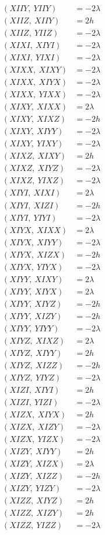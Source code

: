 \documentclass{article}
\begin{document}
\begin{align*}
  (XIIY,\ YIIY) &= - 2 \lambda \\
  (XIIZ,\ XIIY) &= 2 h \\
  (XIIZ,\ YIIZ) &= - 2 \lambda \\
  (XIXI,\ XIYI) &= - 2 \lambda \\
  (XIXI,\ YIXI) &= - 2 \lambda \\
  (XIXX,\ XIXY) &= - 2 \lambda \\
  (XIXX,\ XIYX) &= - 2 \lambda \\
  (XIXX,\ YIXX) &= - 2 \lambda \\
  (XIXY,\ XIXX) &= 2 \lambda \\
  (XIXY,\ XIXZ) &= - 2 h \\
  (XIXY,\ XIYY) &= - 2 \lambda \\
  (XIXY,\ YIXY) &= - 2 \lambda \\
  (XIXZ,\ XIXY) &= 2 h \\
  (XIXZ,\ XIYZ) &= - 2 \lambda \\
  (XIXZ,\ YIXZ) &= - 2 \lambda \\
  (XIYI,\ XIXI) &= 2 \lambda \\
  (XIYI,\ XIZI) &= - 2 h \\
  (XIYI,\ YIYI) &= - 2 \lambda \\
  (XIYX,\ XIXX) &= 2 \lambda \\
  (XIYX,\ XIYY) &= - 2 \lambda \\
  (XIYX,\ XIZX) &= - 2 h \\
  (XIYX,\ YIYX) &= - 2 \lambda \\
  (XIYY,\ XIXY) &= 2 \lambda \\
  (XIYY,\ XIYX) &= 2 \lambda \\
  (XIYY,\ XIYZ) &= - 2 h \\
  (XIYY,\ XIZY) &= - 2 h \\
  (XIYY,\ YIYY) &= - 2 \lambda \\
  (XIYZ,\ XIXZ) &= 2 \lambda \\
  (XIYZ,\ XIYY) &= 2 h \\
  (XIYZ,\ XIZZ) &= - 2 h \\
  (XIYZ,\ YIYZ) &= - 2 \lambda \\
  (XIZI,\ XIYI) &= 2 h \\
  (XIZI,\ YIZI) &= - 2 \lambda \\
  (XIZX,\ XIYX) &= 2 h \\
  (XIZX,\ XIZY) &= - 2 \lambda \\
  (XIZX,\ YIZX) &= - 2 \lambda \\
  (XIZY,\ XIYY) &= 2 h \\
  (XIZY,\ XIZX) &= 2 \lambda \\
  (XIZY,\ XIZZ) &= - 2 h \\
  (XIZY,\ YIZY) &= - 2 \lambda \\
  (XIZZ,\ XIYZ) &= 2 h \\
  (XIZZ,\ XIZY) &= 2 h \\
  (XIZZ,\ YIZZ) &= - 2 \lambda
\end{align*}
\end{document}
